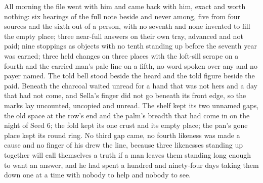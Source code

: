 All morning the file went with him and came back with him, exact and worth nothing: six hearings of the full note beside and never among, five from four sources and the sixth out of a person, with no seventh and none invented to fill the empty place; three near-full answers on their own tray, advanced and not paid; nine stoppings as objects with no tenth standing up before the seventh year was earned; three held changes on three places with the loft-sill scrape on a fourth and the carried man's pale line on a fifth, no word spoken over any and no payer named. The told bell stood beside the heard and the told figure beside the paid. Beneath  the charcoal waited unread for a hand that was not hers and a day that had not come, and Sella's finger did not go beneath its front edge, so the marks lay uncounted, uncopied and unread. The shelf kept its two unnamed gaps, the old space at the row's end and the palm's breadth that had come in on the night of Seed 6; the fold kept its one crust and its empty place; the pan's gone place kept its round ring. No third gap came, no fourth likeness was made a cause and no finger of his drew the line, because three likenesses standing up together will call themselves a truth if a man leaves them standing long enough to want an answer, and he had spent a hundred and ninety-four days taking them down one at a time with nobody to help and nobody to see.

